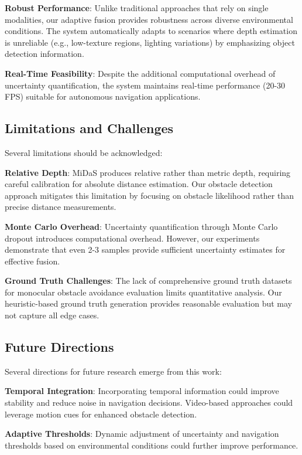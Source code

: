 \documentclass[10pt]{article}
\begin{document}
\textbf{Robust Performance}: Unlike traditional approaches that rely on single modalities, our adaptive fusion provides robustness across diverse environmental conditions. The system automatically adapts to scenarios where depth estimation is unreliable (e.g., low-texture regions, lighting variations) by emphasizing object detection information.

\textbf{Real-Time Feasibility}: Despite the additional computational overhead of uncertainty quantification, the system maintains real-time performance (20-30 FPS) suitable for autonomous navigation applications.

\subsection{Limitations and Challenges}

Several limitations should be acknowledged:

\textbf{Relative Depth}: MiDaS produces relative rather than metric depth, requiring careful calibration for absolute distance estimation. Our obstacle detection approach mitigates this limitation by focusing on obstacle likelihood rather than precise distance measurements.

\textbf{Monte Carlo Overhead}: Uncertainty quantification through Monte Carlo dropout introduces computational overhead. However, our experiments demonstrate that even 2-3 samples provide sufficient uncertainty estimates for effective fusion.

\textbf{Ground Truth Challenges}: The lack of comprehensive ground truth datasets for monocular obstacle avoidance evaluation limits quantitative analysis. Our heuristic-based ground truth generation provides reasonable evaluation but may not capture all edge cases.

\subsection{Future Directions}

Several directions for future research emerge from this work:

\textbf{Temporal Integration}: Incorporating temporal information could improve stability and reduce noise in navigation decisions. Video-based approaches could leverage motion cues for enhanced obstacle detection.

\textbf{Adaptive Thresholds}: Dynamic adjustment of uncertainty and navigation thresholds based on environmental conditions could further improve performance.
\end{document}
